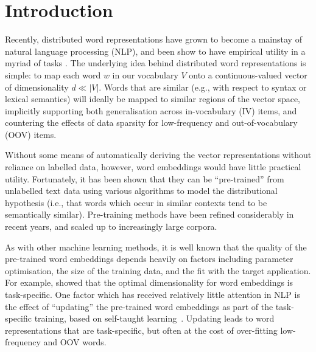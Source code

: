 \section{Introduction}

Recently, distributed word representations have grown to become a
mainstay of natural language processing (NLP), and been show to have
empirical utility in a myriad of tasks
\cite{Collobert2008,turian2010word,baroni:2014,Andreas:Klein:2014}.  The
underlying idea behind distributed word representations is simple: to
map each word $w$ in our vocabulary $V$ onto a continuous-valued vector
of dimensionality $d \ll |V|$.  Words that are similar
(e.g., with respect to syntax or lexical semantics) will ideally be mapped to
similar regions of the vector space, implicitly supporting both
generalisation across in-vocabulary (IV) items, and countering the
effects of data sparsity for low-frequency and out-of-vocabulary (OOV)
items.

Without some means of automatically deriving the vector representations
without reliance on labelled data, however, word embeddings would have
little practical utility. Fortunately, it has been shown that they can
be ``pre-trained'' from unlabelled text data using various algorithms 
to model the distributional hypothesis (i.e., that
words which occur in similar contexts tend to be semantically
similar). Pre-training methods have been refined considerably in recent
years, and scaled up to increasingly large corpora.

As with other machine learning methods, it is well known that the
quality of the pre-trained word embeddings depends heavily on factors
including parameter optimisation, the size of the training data, and the
fit with the target application. For example, 
showed that the optimal dimensionality for word embeddings is task-specific.  
One factor which has received relatively little attention in
NLP is the effect of ``updating'' the pre-trained word embeddings as
part of the task-specific training, based on self-taught
learning~\cite{raina2007self}.  Updating leads to word
representations that are task-specific, but often at the cost of
over-fitting low-frequency and OOV words.


